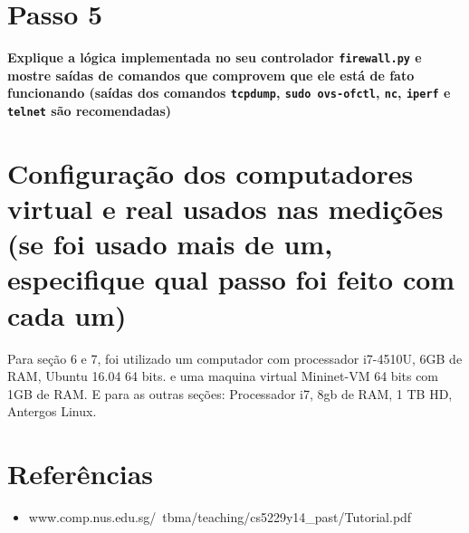 \documentclass[12pt,letterpaper]{article}
\begin{document}
\section{Passo 5}

\textbf{Explique a lógica implementada no seu controlador
\texttt{firewall.py} e mostre saídas de comandos que comprovem que ele
está de fato funcionando (saídas dos comandos \texttt{tcpdump},
\texttt{sudo ovs-ofctl}, \texttt{nc}, \texttt{iperf} e \texttt{telnet}
são recomendadas)}

\section{Configuração dos computadores virtual e real usados nas
medições (se foi usado mais de um, especifique qual passo foi feito
com cada um)}
Para seção 6 e 7, foi utilizado um computador com processador i7-4510U, 6GB de RAM, Ubuntu 16.04 64 bits.
e uma maquina virtual Mininet-VM 64 bits com 1GB de RAM.
\newline
E para as outras seções:
Processador i7, 8gb de RAM, 1 TB HD, Antergos Linux.

\section{Referências}

\begin{itemize}
   \item www.comp.nus.edu.sg/~tbma/teaching/cs5229y14\_past/Tutorial.pdf
\end{itemize}
\end{document}
